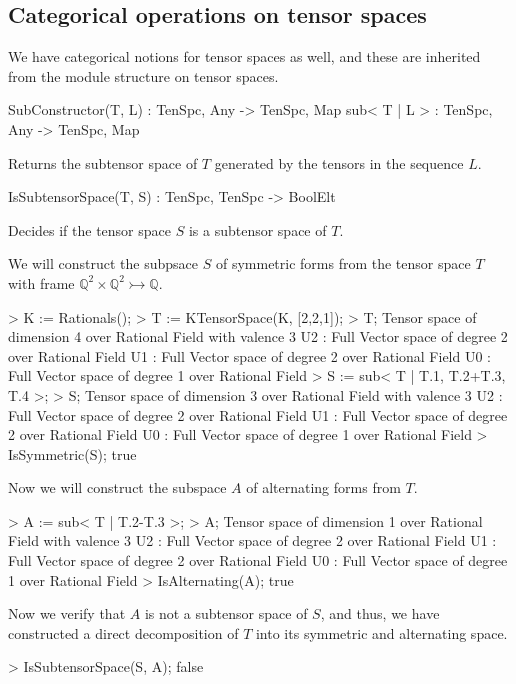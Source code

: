 \subsection{Categorical operations on tensor spaces}

We have categorical notions for tensor spaces as well, and these are inherited from the module structure on tensor spaces.

\begin{intrinsics}
SubConstructor(T, L) : TenSpc, Any -> TenSpc, Map
sub< T | L > : TenSpc, Any -> TenSpc, Map
\end{intrinsics}

Returns the subtensor space of $T$ generated by the tensors in the sequence $L$.

\begin{intrinsics}
IsSubtensorSpace(T, S) : TenSpc, TenSpc -> BoolElt
\end{intrinsics}

Decides if the tensor space $S$ is a subtensor space of $T$.

\begin{example}[SubtensorSpaces]

We will construct the subpsace $S$ of symmetric forms from the tensor space $T$ with frame $\mathbb{Q}^2\times\mathbb{Q}^2\rightarrowtail \mathbb{Q}$.
\begin{code}
> K := Rationals();
> T := KTensorSpace(K, [2,2,1]);
> T;
Tensor space of dimension 4 over Rational Field with valence 3
U2 : Full Vector space of degree 2 over Rational Field
U1 : Full Vector space of degree 2 over Rational Field
U0 : Full Vector space of degree 1 over Rational Field
> S := sub< T | T.1, T.2+T.3, T.4 >;
> S;
Tensor space of dimension 3 over Rational Field with valence 3
U2 : Full Vector space of degree 2 over Rational Field
U1 : Full Vector space of degree 2 over Rational Field
U0 : Full Vector space of degree 1 over Rational Field
> IsSymmetric(S);
true
\end{code}

Now we will construct the subspace $A$ of alternating forms from $T$.
\begin{code}
> A := sub< T | T.2-T.3 >;
> A;
Tensor space of dimension 1 over Rational Field with valence 3
U2 : Full Vector space of degree 2 over Rational Field
U1 : Full Vector space of degree 2 over Rational Field
U0 : Full Vector space of degree 1 over Rational Field
> IsAlternating(A);
true
\end{code}

Now we verify that $A$ is not a subtensor space of $S$, and thus, we have constructed a direct decomposition of $T$ into its symmetric and alternating space.
\begin{code}
> IsSubtensorSpace(S, A);
false
\end{code}
\end{example}

